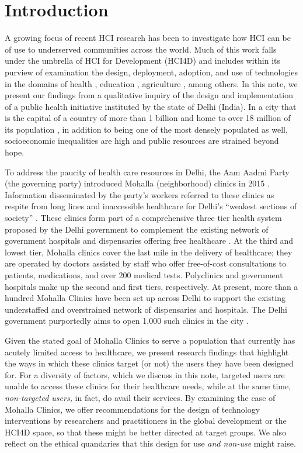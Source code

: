 \section{Introduction}

A growing focus of recent HCI research has been to investigate how HCI can be of use to underserved communities across the world. Much of this work falls under the umbrella of HCI for Development (HCI4D) and includes within its purview of examination the design, deployment, adoption, and use of technologies in the domains of health \cite{PH-CHI;TP}, education \cite{Kam}, agriculture \cite{Patel}, among others. In this note, we present our findings from a qualitative inquiry of the design and implementation of a public health initiative instituted by the state of Delhi (India). In a city that is the capital of a country of more than 1 billion and home to over 18 million of its population \cite{}, in addition to being one of the most densely populated as well, socioeconomic inequalities are high and public resources are strained beyond hope. 

To address the paucity of health care resources in Delhi, the Aam Aadmi Party (the governing party) introduced Mohalla (neighborhood) clinics in 2015 \cite{}. Information disseminated by the party's workers referred to these clinics as respite from long lines and inaccessible healthcare for Delhi's ``weakest sections of society'' \cite{AAPpressrelease}. These clinics form part of a comprehensive three tier health system proposed by the Delhi government to complement the existing network of government hospitals and dispensaries offering free healthcare \cite{article}. At the third and lowest tier, Mohalla clinics cover the last mile in the delivery of healthcare; they are operated by doctors assisted by staff who offer free-of-cost consultations to patients, medications, and over 200 medical tests. Polyclinics and government hospitals make up the second and first tiers, respectively. At present, more than a hundred Mohalla Clinics have been set up across Delhi to support the existing understaffed and overstrained network of dispensaries and hospitals. The Delhi government purportedly aims to open 1,000 such clinics in the city \cite{}.

Given the stated goal of Mohalla Clinics to serve a population that currently has acutely limited access to healthcare, we present research findings that highlight the ways in which these clinics target (or not) the users they have been designed for. For a diversity of factors, which we discuss in this note, targeted users are unable to access these clinics for their healthcare needs, while at the same time, \textit{non-targeted users,} in fact, do avail their services. By examining the case of Mohalla Clinics, we offer recommendations for the design of technology interventions by researchers and practitioners in the global development or the HCI4D space, so that these might be better directed at target groups. We also reflect on the ethical quandaries that this design for use \emph{and non-use} might raise. 

